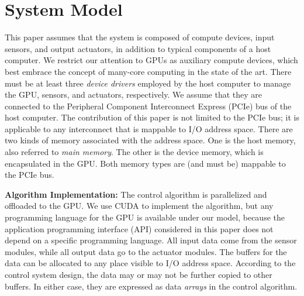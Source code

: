 \section{System Model}
\label{sec:system_model}

This paper assumes that the system is composed of compute devices, input
sensors, and output actuators, in addition to typical components of a
host computer.
We restrict our attention to GPUs as auxiliary compute devices,
which best embrace the concept of many-core computing in the state of
the art.
There must be at least three \textit{device drivers} employed by the
host computer to manage the GPU, sensors, and actuators,
respectively.
We assume that they are connected to the Peripheral Component
Interconnect Express (PCIe) bus of the host computer.
The contribution of this paper is not limited to the PCIe bus; it is
applicable to any interconnect that is mappable to I/O address space.
There are two kinds of memory associated with the address space.
One is the host memory, also referred to \emph{main memory}.
The other is the device memory, which is encapsulated in the GPU.
Both memory types are (and must be) mappable to the PCIe bus.

\textbf{Algorithm Implementation:}
The control algorithm is parallelized and offloaded to the GPU.
We use CUDA to implement the algorithm, but any programming
language for the GPU is available under our model, because the
application programming interface (API) considered in this paper does
not depend on a specific programming language.
All input data come from the sensor modules, while all output data go to
the actuator modules.
The buffers for the data can be allocated to any place visible to I/O
address space.
According to the control system design, the data may or may not be
further copied to other buffers.
In either case, they are expressed as data \textit{arrays} in the
control algorithm.

